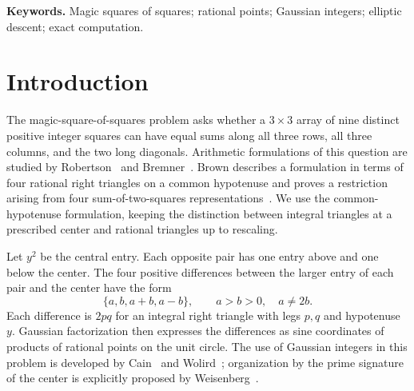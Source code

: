 \documentclass[11pt,letterpaper]{article}
\theoremstyle{definition}\newtheorem{definition}[theorem]{Definition}
\theoremstyle{remark}\newtheorem{remark}[theorem]{Remark}
\begin{document}
\begin{abstract}
quadratic-Chabauty problem. The torsion-coset hypothesis holds on all $1{,}916{,}672$ rational points of the solution varieties with three parameters of projective height at most five; a degeneracy-rank lemma explains the structure of these points, and a trichotomy on the signed systems shows that every rational solution is admissible, has a vanishing sine, or has one offset exactly twice another; the data are consistent with the hypothesis that every rational solution has a vanishing sine, which implies both rigidity and the torsion-coset hypothesis and is strictly stronger than the former. No rational point of height up to $10^6$ exists on the genus-five curve beyond the eight known.
\end{abstract}
\medskip
\noindent\textbf{Keywords.} Magic squares of squares; rational points; Gaussian integers; elliptic descent; exact computation.

\section{Introduction}\label{sec:introduction}
The magic-square-of-squares problem asks whether a $3\times3$ array of nine distinct positive integer squares can have equal sums along all three rows, all three columns, and the two long diagonals. Arithmetic formulations of this question are studied by Robertson~\cite{Robertson} and Bremner~\cite{Bremner}. Brown describes a formulation in terms of four rational right triangles on a common hypotenuse and proves a restriction arising from four sum-of-two-squares representations~\cite{Brown511,Brown417}. We use the common-hypotenuse formulation, keeping the distinction between integral triangles at a prescribed center and rational triangles up to rescaling.

Let $y^2$ be the central entry. Each opposite pair has one entry above and one below the center. The four positive differences between the larger entry of each pair and the center have the form
\begin{equation}\label{eq:pattern}
 \{a,b,a+b,a-b\},\qquad a>b>0,\quad a\ne2b.
\end{equation}
Each difference is $2pq$ for an integral right triangle with legs $p,q$ and hypotenuse $y$. Gaussian factorization then expresses the differences as sine coordinates of products of rational points on the unit circle. The use of Gaussian integers in this problem is developed by Cain~\cite{Cain} and Wolird~\cite{Wolird}; organization by the prime signature of the center is explicitly proposed by Weisenberg~\cite{Weisenberg}.
\end{document}
